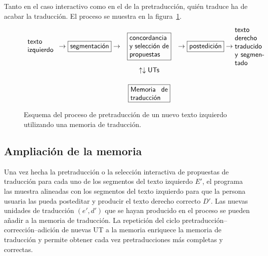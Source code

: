 Tanto en el caso interactivo como en el de la pretraducción, quién traduce ha de acabar la traducción. El proceso se muestra en la figura~\ref{fg:preMT}. \begin{figure} {\small $$ \begin{array}{rcl} \mbox{\parbox{1.5cm}{\textsf{texto izquierdo}}} \to\mbox{\framebox{\textsf{segmentación}}} \to &\mbox{\framebox{\parbox{2.0cm}{\textsf{concordancia y selección de propuestas}}}} &\to \mbox{\framebox{\textsf{postedición}}} \to \mbox{\parbox{1.5cm}{\textsf{texto derecho traducido y segmentado}}} \\[0.8cm] &\uparrow \downarrow \mbox{\textsf{UTs}}& \\[0.5cm] &\mbox{\framebox{\parbox{1.9cm}{\textsf{Memoria de traducción}}}} &\\ \end{array} $$ } \caption{Esquema del proceso de pretraducción de un nuevo texto izquierdo utilizando una memoria de traducción.} \label{fg:preMT} \end{figure} 

\subsection{Ampliación de la memoria} 

Una vez hecha la pretraducción o la selección interactiva de propuestas de traducción para cada uno de los segmentos del texto izquierdo $E'$, el programa las muestra alineadas con los segmentos del texto izquierdo para que la persona usuaria las pueda posteditar y producir el texto derecho correcto $D'$. Las nuevas unidades de traducción $(e',d')$ que se hayan producido en el proceso se pueden añadir a la memoria de traducción. La repetición del ciclo pretraducción--corrección--adición de nuevas UT a la memoria enriquece la memoria de traducción y permite obtener cada vez pretraducciones más completas y correctas. 


